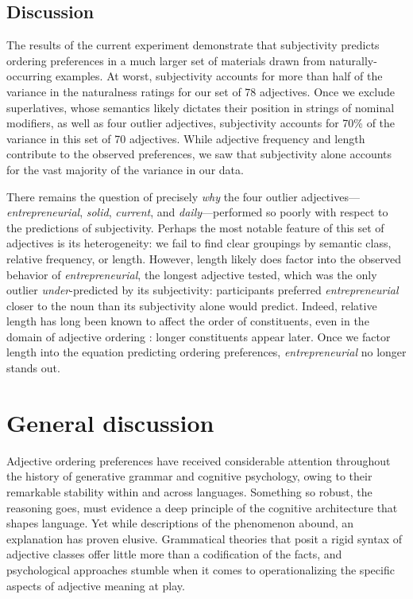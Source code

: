 \documentclass[manuscript]{stjour}
\begin{document}
\subsection{Discussion}

The results of the current experiment demonstrate that subjectivity predicts ordering preferences %
in a much larger set of materials drawn from naturally-occurring examples. At worst, subjectivity accounts for more than half of the variance in the naturalness ratings for our set of 78 adjectives. Once we exclude superlatives, whose semantics likely dictates their position in strings of nominal modifiers, as well as four outlier adjectives, subjectivity accounts for 70\% of the variance in this set of 70 adjectives. While adjective frequency and length contribute to the observed preferences, we saw that subjectivity alone accounts for the vast majority of the variance in our data.

There remains the question of precisely \emph{why} the four outlier adjectives---​\emph{entrepreneurial}​, ​\emph{solid}​, ​\emph{current}​, and ​\emph{daily}---performed so poorly with respect to the predictions of subjectivity. Perhaps the most notable feature of this set of adjectives is its heterogeneity: we fail to find clear groupings by semantic class, relative frequency, or length. However, length likely does factor into the observed behavior of \emph{entrepreneurial}, the longest adjective tested, which was the only outlier \emph{under}-predicted by its subjectivity: participants preferred \emph{entrepreneurial} closer to the noun than its subjectivity alone would predict. Indeed, relative length has long been known to affect the order of constituents, even in the domain of adjective ordering \citep{wulff2003}: longer constituents appear later. Once we factor length into the equation predicting ordering preferences, \emph{entrepreneurial} no longer stands out.


\section{General discussion}

Adjective ordering preferences have received considerable attention throughout the history of generative grammar and cognitive psychology, owing to their remarkable stability within and across languages. Something so robust, the reasoning goes, must evidence a deep principle of the cognitive architecture that shapes language. Yet while descriptions of the phenomenon abound, an explanation has proven elusive. Grammatical theories that posit a rigid syntax of adjective classes offer little more than a codification of the facts, and psychological approaches stumble when it comes to operationalizing the specific aspects of adjective meaning at play. 
\end{document}
